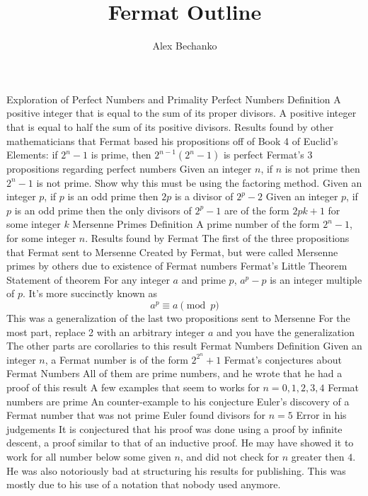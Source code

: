 \documentclass[11pt]{article}
\title{Fermat Outline}
\author{Alex Bechanko}
\begin{document}
\maketitle
\begin{outline}[enumerate]
\1 Exploration of Perfect Numbers and Primality
    \2 Perfect Numbers
        \3 Definition
            \4 A positive integer that is equal to the sum of its proper divisors.
            \4 A positive integer that is equal to half the sum of its positive divisors.
        \3 Results found by other mathematicians that Fermat based his propositions off of
            \4 Book 4 of Euclid's Elements: if $2^n-1$ is prime, then $2^{n-1}(2^n-1)$ is perfect
        \3 Fermat's 3 propositions regarding perfect numbers
            \4 Given an integer $n$, if $n$ is not prime then $2^n - 1$ is not prime. Show why this must be using the factoring method.
            \4 Given an integer $p$, if $p$ is an odd prime then $2p$ is a divisor of $2^p-2$
            \4 Given an integer $p$, if $p$ is an odd prime then the only divisors of $2^p-1$ are of the form $2pk+1$ for
               some integer $k$
    \2 Mersenne Primes
        \3 Definition
            \4 A prime number of the form $2^n - 1$, for some integer $n$.
        \3 Results found by Fermat
            \4 The first of the three propositions that Fermat sent to Mersenne
        \3 Created by Fermat, but were called Mersenne primes by others due to existence of Fermat numbers
    \2 Fermat's Little Theorem
        \3 Statement of theorem
            \4 For any integer $a$ and prime $p$, $a^p - p$ is an integer multiple of $p$.
            \4 It's more succinctly known as \[a^p \equiv a \pmod{p}\]
        \3 This was a generalization of the last two propositions sent to Mersenne
            \4 For the most part, replace 2 with an arbitrary integer $a$ and you have the generalization
            \4 The other parts are corollaries to this result
    \2 Fermat Numbers
        \3 Definition
            \4 Given an integer $n$, a Fermat number is of the form $2^{2^n}+1$
        \3 Fermat's conjectures about Fermat Numbers
            \4 All of them are prime numbers, and he wrote that he had a proof of this result
        \3 A few examples that seem to works
            \4 for $n=0,1,2,3,4$ Fermat numbers are prime
        \3 An counter-example to his conjecture
            \4 Euler's discovery of a Fermat number that was not prime
            \4 Euler found divisors for $n=5$
        \3 Error in his judgements
            \4 It is conjectured that his proof was done using a proof by infinite descent, a proof similar to that of an
               inductive proof.
            \4 He may have showed it to work for all number below some given $n$, and did not check for $n$ greater then $4$.
            \4 He was also notoriously bad at structuring his results for publishing. This was mostly due to his use of
               a notation that nobody used anymore.


\end{outline}
\end{document}
